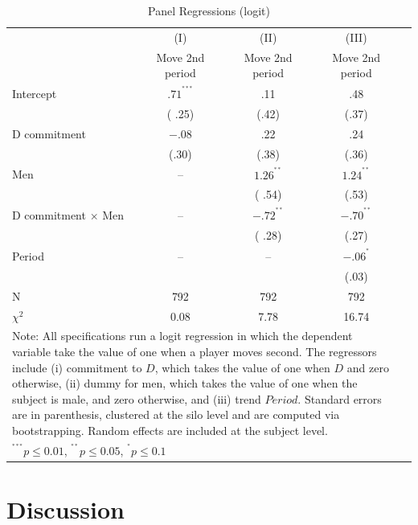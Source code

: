 \documentclass[12pt, letterpaper]{article}
\theoremstyle{plain}
\begin{document}
\begin{table}[ht]
\centering
\caption{Panel Regressions (logit)}
\footnotesize
\begin{tabular}{lcccc}

  & (I) & (II) & (III) \\
&  Move 2nd period &  Move 2nd period & Move 2nd period\\
    \hline
Intercept &  $.71^{^{***}}$ & .11 & .48\\
& ( .25) & (.42) & (.37) \\
D commitment & $-.08$ & .22& .24\\
& (.30) & (.38) & (.36) \\
Men & -- &  $1.26^{^{**}}$ &  $1.24^{^{**}}$\\
& & ( .54) & (.53) \\
D commitment $\times$ Men & -- & $-.72^{^{**}}$ & $-.70^{^{**}}$\\
& & ( .28) & (.27) \\
Period & -- & --& $-.06^{^{*}}$\\
& & & (.03) \\

\hline
N & 792 & 792 & 792 \\ 
$\chi^2$ &  0.08  &  7.78 &  16.74\\
\hline
\hline
 \multicolumn{4}{p{.8\textwidth}}{\scriptsize{Note: All specifications run a logit regression in which the dependent variable take the value of one when a player moves second. The regressors include (i) commitment to $D$, which takes the value of one when $D$ and zero otherwise, (ii) dummy for men, which takes the value of one when the subject is male, and zero otherwise, and (iii) trend $Period$. Standard errors are in parenthesis, clustered at the silo level and are computed via bootstrapping. Random effects are included at the subject level. }}\\ 
 \multicolumn{4}{p{0.4\textwidth}}{\scriptsize{ $^{^{***}}p\leq0.01$,
    $^{^{**}}p\leq0.05$, $^{^{*}}p\leq0.1$}} \\
\end{tabular}
\label{table:move_cge}
\end{table}


\section{Discussion}
\label{sec:discuss}
\end{document}
